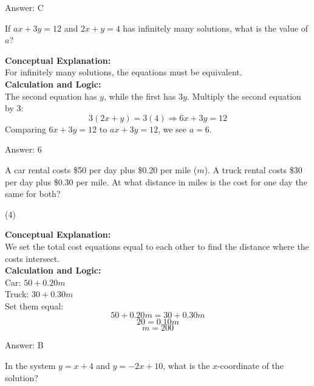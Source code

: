 \documentclass[11pt,paper=a4,answers]{exam}
\begin{document}
\begin{questions}
\begin{solution}
\vspace{15pt}
Answer: \colorbox{yellow!100}{C}
\end{solution}

\question
If $ax + 3y = 12$ and $2x + y = 4$ has infinitely many solutions, what is the value of $a$?

\begin{solution}
\textbf{Conceptual Explanation:} \\
For infinitely many solutions, the equations must be equivalent.
\\[10pt]
\textbf{Calculation and Logic:} \\
The second equation has $y$, while the first has $3y$. Multiply the second equation by 3:
\[3(2x + y) = 3(4) \Rightarrow 6x + 3y = 12\]
Comparing $6x + 3y = 12$ to $ax + 3y = 12$, we see $a = 6$.

\vspace{15pt}
Answer: \colorbox{yellow!100}{6}
\end{solution}

\question
A car rental costs \$50 per day plus \$0.20 per mile ($m$). A truck rental costs \$30 per day plus \$0.30 per mile. At what distance in miles is the cost for one day the same for both?
\begin{tasks}(4)
\end{tasks}

\begin{solution}
\textbf{Conceptual Explanation:} \\
We set the total cost equations equal to each other to find the distance where the costs intersect.
\\[10pt]
\textbf{Calculation and Logic:} \\
Car: $50 + 0.20m$ \\
Truck: $30 + 0.30m$ \\
Set them equal:
\[50 + 0.20m = 30 + 0.30m\]
\[20 = 0.10m\]
\[m = 200\]

\vspace{15pt}
Answer: \colorbox{yellow!100}{B}
\end{solution}

\question
In the system $y = x + 4$ and $y = -2x + 10$, what is the $x$-coordinate of the solution?


\end{questions}
\end{document}
